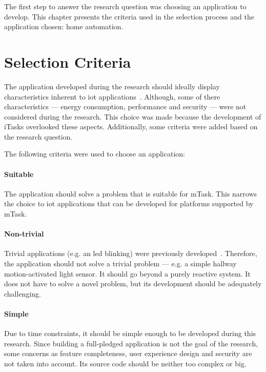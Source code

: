 The first step to answer the research question was choosing an application to develop. This chapter presents the criteria used in the selection process and the application chosen: home automation.

\section{Selection Criteria}\label{sec:selec_cri}

The application developed during the research should ideally display characteristics inherent to \acs{iot} applications~\cite{survey,survey2,survey3}. Although, some of there characteristics --- energy consumption, performance and security --- were not considered during the research. This choice was made because the development of \gls{iTasks} overlooked these aspects. Additionally, some criteria were added based on the research question.

The following criteria were used to choose an application:

\paragraph{Suitable} The application should solve a problem that is suitable for \gls{mTask}. This narrows the choice to \ac{iot} applications that can be developed for platforms supported by \gls{mTask}.

\paragraph{Non-trivial} Trivial applications (e.g. an \acs{led} blinking) were previously developed~\cite{martthesis}. Therefore, the application should not solve a trivial problem --- e.g. a simple hallway  motion-activated light sensor. It should go beyond a purely reactive system. It does not have to solve a novel problem, but its development should be adequately challenging.

\paragraph{Simple} Due to time constraints, it should be simple enough to be developed during this research. Since building a full-pledged application is not the goal of the research, some concerns as feature completeness, user experience design and security are not taken into account. Its source code should be neither too complex or big.

